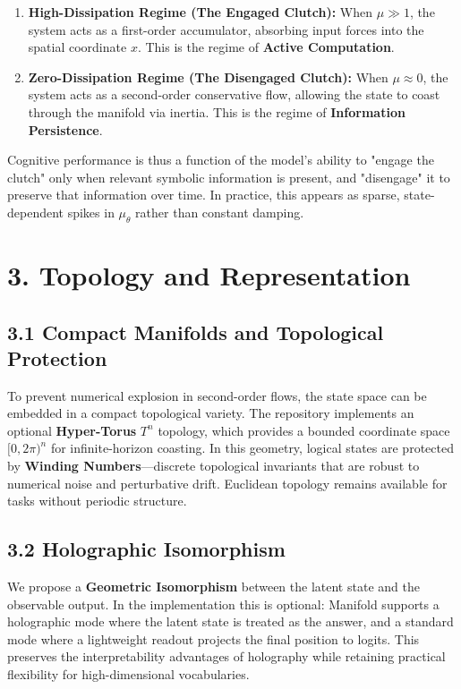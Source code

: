 \documentclass[12pt]{article}
\begin{document}
\begin{enumerate}
\item \textbf{High-Dissipation Regime (The Engaged Clutch):} When $\mu \gg 1$, the system acts as a first-order accumulator, absorbing input forces into the spatial coordinate $x$. This is the regime of \textbf{Active Computation}.
\item \textbf{Zero-Dissipation Regime (The Disengaged Clutch):} When $\mu \approx 0$, the system acts as a second-order conservative flow, allowing the state to coast through the manifold via inertia. This is the regime of \textbf{Information Persistence}.
\end{enumerate}

Cognitive performance is thus a function of the model's ability to "engage the clutch" only when relevant symbolic information is present, and "disengage" it to preserve that information over time. In practice, this appears as sparse, state-dependent spikes in $\mu_\theta$ rather than constant damping.

\section{3. Topology and Representation}

\subsection*{3.1 Compact Manifolds and Topological Protection}

To prevent numerical explosion in second-order flows, the state space can be embedded in a compact topological variety. The repository implements an optional \textbf{Hyper-Torus} $T^n$ topology, which provides a bounded coordinate space $[0, 2\pi)^n$ for infinite-horizon coasting. In this geometry, logical states are protected by \textbf{Winding Numbers}—discrete topological invariants that are robust to numerical noise and perturbative drift. Euclidean topology remains available for tasks without periodic structure.

\subsection*{3.2 Holographic Isomorphism}

We propose a \textbf{Geometric Isomorphism} between the latent state and the observable output. In the implementation this is optional: Manifold supports a holographic mode where the latent state is treated as the answer, and a standard mode where a lightweight readout projects the final position to logits. This preserves the interpretability advantages of holography while retaining practical flexibility for high-dimensional vocabularies.
\end{document}
